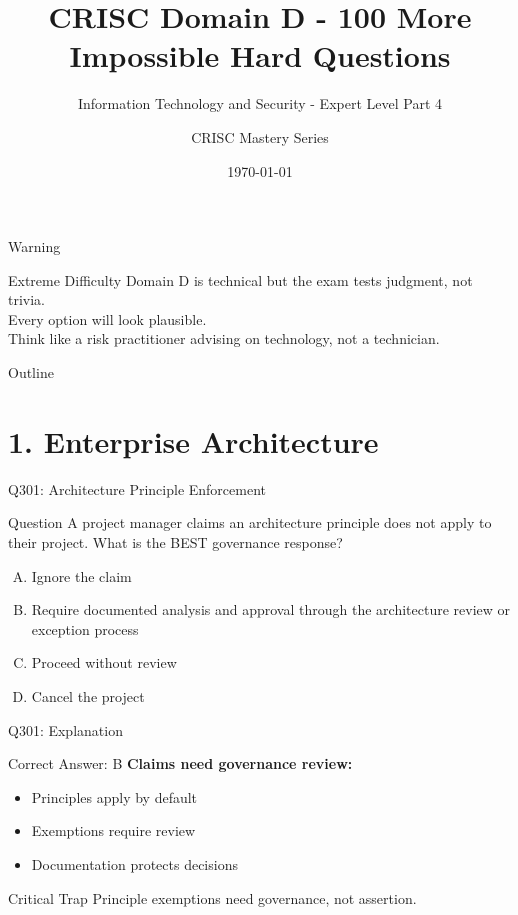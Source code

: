 \documentclass{beamer}
\title{CRISC Domain D - 100 More Impossible Hard Questions}
\subtitle{Information Technology and Security - Expert Level Part 4}
\author{CRISC Mastery Series}
\date{\today}
\begin{document}
	
	\begin{frame}
		\titlepage
	\end{frame}
	
	\begin{frame}{Warning}
		\begin{alertblock}{Extreme Difficulty}
			Domain D is technical but the exam tests judgment, not trivia.\\
			Every option will look plausible.\\
			Think like a risk practitioner advising on technology, not a technician.
		\end{alertblock}
	\end{frame}
	
	\begin{frame}{Outline}
		\tableofcontents
	\end{frame}
	
	\section{1. Enterprise Architecture}
	
	\begin{frame}{Q301: Architecture Principle Enforcement}
		\begin{block}{Question}
			A project manager claims an architecture principle does not apply to their project. What is the BEST governance response?
		\end{block}
		\begin{enumerate}[(A)]
			\item Ignore the claim
			\item Require documented analysis and approval through the architecture review or exception process
			\item Proceed without review
			\item Cancel the project
		\end{enumerate}
	\end{frame}
	
	\begin{frame}{Q301: Explanation}
		\begin{block}{Correct Answer: B}
			\textbf{Claims need governance review:}
			\begin{itemize}
				\item Principles apply by default
				\item Exemptions require review
				\item Documentation protects decisions
			\end{itemize}
		\end{block}
		\begin{alertblock}{Critical Trap}
			Principle exemptions need governance, not assertion.
		\end{alertblock}
	\end{frame}
	
\end{document}
